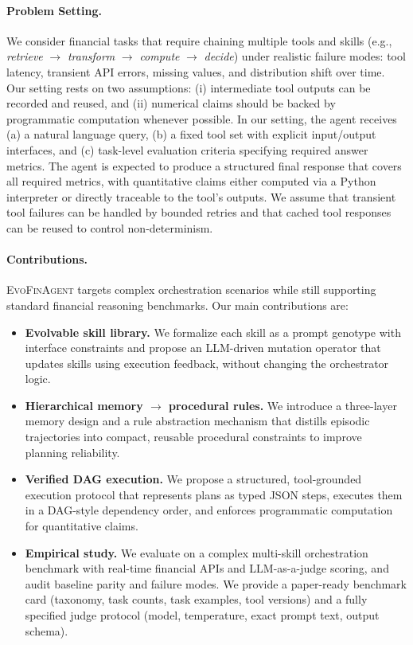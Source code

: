 \documentclass{article}
\begin{document}
\paragraph{Problem Setting.}
We consider financial tasks that require chaining multiple tools and skills (e.g., \emph{retrieve} $\rightarrow$ \emph{transform} $\rightarrow$ \emph{compute} $\rightarrow$ \emph{decide}) under realistic failure modes: tool latency, transient API errors, missing values, and distribution shift over time. 
Our setting rests on two assumptions: (i) intermediate tool outputs can be recorded and reused, and (ii) numerical claims should be backed by programmatic computation whenever possible.
In our setting, the agent receives (a) a natural language query, (b) a fixed tool set with explicit input/output interfaces, and (c) task-level evaluation criteria specifying required answer metrics. 
The agent is expected to produce a structured final response that covers all required metrics, with quantitative claims either computed via a Python interpreter or directly traceable to the tool's outputs. 
We assume that transient tool failures can be handled by bounded retries and that cached tool responses can be reused to control non-determinism.

\paragraph{Contributions.}
\textsc{EvoFinAgent} targets complex orchestration scenarios while still supporting standard financial reasoning benchmarks. Our main contributions are:
\begin{itemize}
  \item \textbf{Evolvable skill library.} We formalize each skill as a prompt genotype with interface constraints and propose an LLM-driven mutation operator that updates skills using execution feedback, without changing the orchestrator logic.
  \item \textbf{Hierarchical memory $\rightarrow$ procedural rules.} We introduce a three-layer memory design and a rule abstraction mechanism that distills episodic trajectories into compact, reusable procedural constraints to improve planning reliability.
  \item \textbf{Verified DAG execution.} We propose a structured, tool-grounded execution protocol that represents plans as typed JSON steps, executes them in a DAG-style dependency order, and enforces programmatic computation for quantitative claims.
  \item \textbf{Empirical study.} We evaluate on a complex multi-skill orchestration benchmark with real-time financial APIs and LLM-as-a-judge scoring, and audit baseline parity and failure modes. We provide a paper-ready benchmark card (taxonomy, task counts, task examples, tool versions) and a fully specified judge protocol (model, temperature, exact prompt text, output schema).
\end{itemize}
\end{document}
